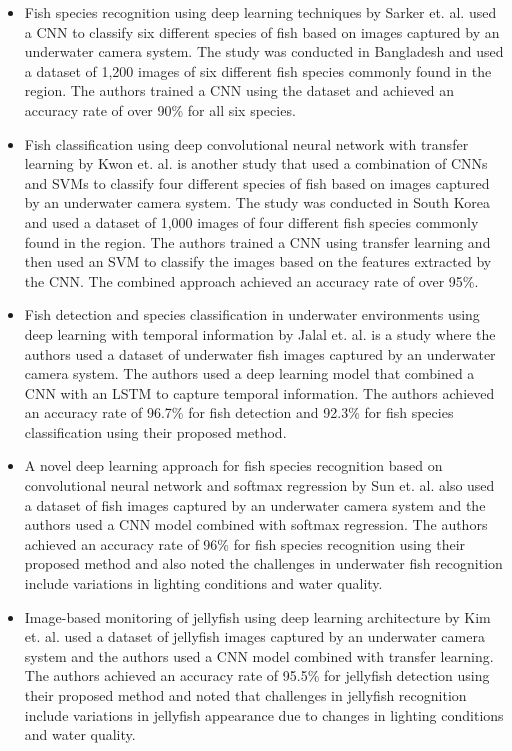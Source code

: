 \begin{itemize}
    \item Fish species recognition using deep learning techniques by Sarker et. al. \cite{sarker2018fish} used a CNN to classify six different species of fish based on images captured by an underwater camera system. The study was conducted in Bangladesh and used a dataset of 1,200 images of six different fish species commonly found in the region. The authors trained a CNN using the dataset and achieved an accuracy rate of over 90\% for all six species.
    \item Fish classification using deep convolutional neural network with transfer learning by Kwon et. al. \cite{kwon2019fish} is another study that used a combination of CNNs and SVMs to classify four different species of fish based on images captured by an underwater camera system. The study was conducted in South Korea and used a dataset of 1,000 images of four different fish species commonly found in the region. The authors trained a CNN using transfer learning and then used an SVM to classify the images based on the features extracted by the CNN. The combined approach achieved an accuracy rate of over 95\%.
    \item Fish detection and species classification in underwater environments using deep learning with temporal information by Jalal et. al. \cite{jalal2020fish} is a study where the authors used a dataset of underwater fish images captured by an underwater camera system. The authors used a deep learning model that combined a CNN with an LSTM to capture temporal information. The authors achieved an accuracy rate of 96.7\% for fish detection and 92.3\% for fish species classification using their proposed method. 
    \item  A novel deep learning approach for fish species recognition based on convolutional neural network and softmax regression by Sun et. al. \cite{sun2018novel} also used a dataset of fish images captured by an underwater camera system and the authors used a CNN model combined with softmax regression. The authors achieved an accuracy rate of 96\% for fish species recognition using their proposed method and also noted the challenges in underwater fish recognition include variations in lighting conditions and water quality.
    \item Image-based monitoring of jellyfish using deep learning architecture by Kim et. al. \cite{kim2016image} used a dataset of jellyfish images captured by an underwater camera system and the authors used a CNN model combined with transfer learning. The authors achieved an accuracy rate of 95.5\% for jellyfish detection using their proposed method and noted that challenges in jellyfish recognition include variations in jellyfish appearance due to changes in lighting conditions and water quality.

\end{itemize}
